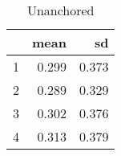 \begin{table}[ht]
\centering
\begin{tabular}{rrr}
  \hline
 & mean & sd \\ 
  \hline
1 & 0.299 & 0.373 \\ 
  2 & 0.289 & 0.329 \\ 
  3 & 0.302 & 0.376 \\ 
  4 & 0.313 & 0.379 \\ 
   \hline
\end{tabular}
\caption{Unanchored} 
\label{table:theta}
\end{table}
